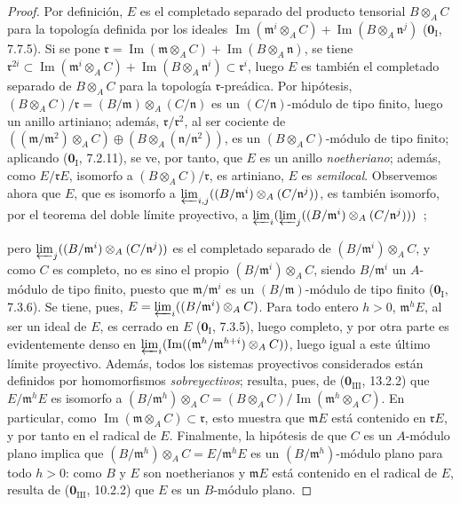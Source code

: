 \begin{proof}
Por definición, $E$ es el completado separado del producto tensorial $B\otimes_A C$
para la topología definida por los ideales
$\operatorname{Im}(\mathfrak m^i\otimes_A C)+
\operatorname{Im}(B\otimes_A\mathfrak n^j)$
($\mathbf 0_{\mathrm I}$, 7.7.5). Si se pone
$\mathfrak r=\operatorname{Im}(\mathfrak m\otimes_A C)+
\operatorname{Im}(B\otimes_A\mathfrak n)$,
se tiene
$\mathfrak r^{2i}\subset
\operatorname{Im}(\mathfrak m^i\otimes_A C)+
\operatorname{Im}(B\otimes_A\mathfrak n^i)\subset\mathfrak r^i$, luego $E$
es también el completado separado de $B\otimes_A C$ para la topología
$\mathfrak r$-preádica. Por hipótesis,
$(B\otimes_A C)/\mathfrak r=(B/\mathfrak m)\otimes_A(C/\mathfrak n)$ es un
$(C/\mathfrak n)$-módulo de tipo finito, luego un anillo artiniano; además,
$\mathfrak r/\mathfrak r^2$, al ser cociente de
$((\mathfrak m/\mathfrak m^2)\otimes_A C)
\oplus(B\otimes_A(\mathfrak n/\mathfrak n^2))$,
es un $(B\otimes_A C)$-módulo de tipo finito; aplicando
($\mathbf 0_{\mathrm I}$, 7.2.11), se ve, por tanto, que $E$ es un anillo
\emph{noetheriano}; además, como $E/\mathfrak rE$, isomorfo a
$(B\otimes_A C)/\mathfrak r$, es artiniano, $E$ es \emph{semilocal}.
Observemos ahora que $E$, que es isomorfo a
$\varprojlim_{i,j}((B/\mathfrak m^i)\otimes_A(C/\mathfrak n^j))$,
es también isomorfo, por el teorema del doble límite proyectivo, a
$\varprojlim_i(\varprojlim_j
  ((B/\mathfrak m^i)\otimes_A(C/\mathfrak n^j)))$~;



pero $\varprojlim_j((B/\mathfrak m^i)\otimes_A(C/\mathfrak n^j))$
 es el
completado separado de $(B/\mathfrak m^i)\otimes_A C$, y como $C$ es completo,
no es sino el propio $(B/\mathfrak m^i)\otimes_A C$,
siendo $B/\mathfrak m^i$ un $A$-módulo de tipo finito, puesto que
$\mathfrak m/\mathfrak m^i$ es un $(B/\mathfrak m)$-módulo de tipo finito
($\mathbf 0_{\mathrm I}$, 7.3.6). Se tiene, pues,
$E=\varprojlim_i((B/\mathfrak m^i)\otimes_A C)$.
Para todo entero $h>0$, $\mathfrak m^hE$, al ser un ideal de $E$, es cerrado
en $E$ ($\mathbf 0_{\mathrm I}$, 7.3.5), luego completo, y por otra parte es
evidentemente denso en
$\varprojlim_i(\operatorname{Im}((\mathfrak m^h/\mathfrak m^{h+i})\otimes_A C))$,
luego igual a este último límite proyectivo. Además, todos los sistemas
proyectivos considerados están definidos por homomorfismos \emph{sobreyectivos};
resulta, pues, de ($\mathbf 0_{\mathrm{III}}$, 13.2.2) que
$E/\mathfrak m^hE$ es isomorfo a
$(B/\mathfrak m^h)\otimes_A C=(B\otimes_A C)/\operatorname{Im}(\mathfrak m^h\otimes_A C)$.
En particular, como
$\operatorname{Im}(\mathfrak m\otimes_A C)\subset\mathfrak r$, esto muestra
que $\mathfrak mE$ está contenido en $\mathfrak rE$, y por tanto en el radical de
$E$. Finalmente, la hipótesis de que $C$ es un $A$-módulo plano implica que
$(B/\mathfrak m^h)\otimes_A C=E/\mathfrak m^hE$ es un
$(B/\mathfrak m^h)$-módulo plano para todo $h>0$: como $B$ y $E$ son
noetherianos y $\mathfrak mE$ está contenido en el radical de $E$,
resulta de ($\mathbf 0_{\mathrm{III}}$, 10.2.2) que $E$ es un $B$-módulo
plano.
\end{proof}

